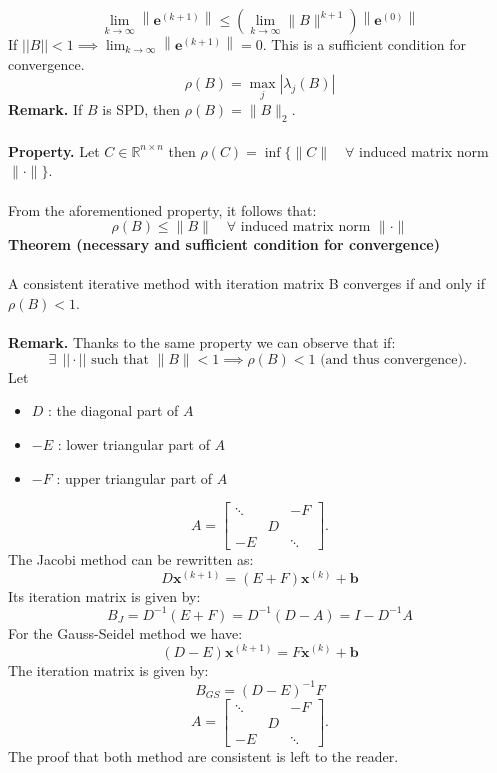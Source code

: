 \documentclass[11pt]{book}
\begin{document}
$$
\lim _{k \rightarrow \infty}\left\|\boldsymbol{e}^{(k+1)}\right\| \leq\left(\lim _{k \rightarrow \infty}\|B\|^{k+1}\right)\left\|\boldsymbol{e}^{(0)}\right\|
$$
If $ ||B|| < 1 \implies \lim _{k \rightarrow \infty}\left\|\boldsymbol{e}^{(k+1)}\right\|=0
$. This is a sufficient condition for convergence.
$$
\rho(B)=\max _{j}\left|\lambda_{j}(B)\right|
$$
\textbf{Remark.} If $B$ is SPD, then $\rho(B)=\|B\|_{2}$.\\ \\
\textbf{Property.} Let $C \in \mathbb{R}^{n \times n}$ then $\rho(C)=\inf \{\|C\| \quad \forall$ induced matrix norm $\|\cdot\|\}$.\\ \\
From the aforementioned property, it follows that:
$$
\rho(B) \leq\|B\| \quad \forall \text { induced matrix norm }\|\cdot\|
$$
\textbf{Theorem (necessary and sufficient condition for convergence)}\\ \\
A consistent iterative method with iteration matrix B converges if and only if $\rho(B)<1$.\\ \\
\textbf{Remark.} Thanks to the same property we can observe that if:
$$
\exists\ \ ||\cdot|| \text { such that }\|B\|<1 \implies \rho(B)<1 \text { (and thus convergence). }
$$
Let
\begin{itemize}
  \item $D$ : the diagonal part of $A$
  \item $-E$ : lower triangular part of $A$
  \item $-F$ : upper triangular part of $A$
\end{itemize}
$$
A=\left[\begin{array}{ccc}
\ddots & & -F \\
& D & \\
-E & & \ddots
\end{array} \right].
$$
The Jacobi method can be rewritten as:
$$
D \boldsymbol{x}^{(k+1)}=(E+F) \boldsymbol{x}^{(k)}+\boldsymbol{b}
$$
Its iteration matrix is given by:
$$
B_{J}=D^{-1}(E+F)=D^{-1}(D-A)=I-D^{-1} A
$$
For the Gauss-Seidel method we have:
$$
(D-E) \boldsymbol{x}^{(k+1)}=F \boldsymbol{x}^{(k)}+\boldsymbol{b}
$$
The iteration matrix is given by:
$$
B_{G S}=(D-E)^{-1} F
$$
$$
A=\left[\begin{array}{ccc}
\ddots & & -F \\
& D & \\
-E & & \ddots
\end{array} \right].
$$
The proof that both method are consistent is left to the reader.\\ \\
\end{document}

